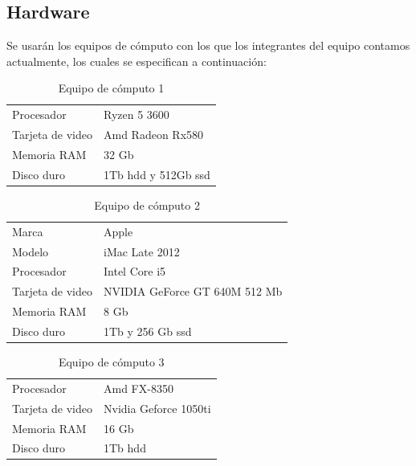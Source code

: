 \documentclass[12pt, a4paper, titlepage]{report}
\begin{document}
			   	\subsection{Hardware}
		Se usarán los equipos de cómputo con los que los integrantes del equipo contamos actualmente, los cuales se especifican a continuación: 
		\begin{table}[H]
			\caption[Equipo de cómputo 1]{Equipo de cómputo 1}
			\begin{tabular}{|p{3.5cm}||p{10cm}|}
				\rowcolor{guindapoli}
				\multicolumn{2}{|c|}{\textbf{\textcolor{white}{Equipo de cómputo utilizado.}}}\\
				\hline
				\rowcolor{azulclaro}Procesador & Ryzen 5 3600\\
				\hline
				\rowcolor{white}Tarjeta de video & Amd Radeon Rx580\\
				\hline
				\rowcolor{azulclaro}Memoria RAM & 32 Gb\\
				\hline
				\rowcolor{white}Disco duro & 1Tb \acrshort{hdd} y 512Gb \acrshort{ssd}\\
				\hline
			\end{tabular}
		\end{table}

		\begin{table}[H]
			\caption[Equipo de cómputo 2]{Equipo de cómputo 2}
			\begin{tabular}{|p{3.5cm}||p{10cm}|}
				\rowcolor{guindapoli}
				\multicolumn{2}{|c|}{\textbf{\textcolor{white}{Equipo de cómputo utilizado.}}}\\
				\hline
				\rowcolor{azulclaro}Marca & Apple\\
				\hline
				\rowcolor{white}Modelo & iMac Late 2012\\
				\hline
				\rowcolor{azulclaro}Procesador & Intel Core i5\\
				\hline
				\rowcolor{white}Tarjeta de video & NVIDIA GeForce GT 640M 512 Mb\\
				\hline
				\rowcolor{azulclaro}Memoria RAM & 8 Gb\\
				\hline
				\rowcolor{white}Disco duro & 1Tb y 256 Gb \acrshort{ssd}\\
				\hline
			\end{tabular}
		\end{table}

		\begin{table}[H]
			\caption[Equipo de cómputo 3]{Equipo de cómputo 3}
			\begin{tabular}{|p{3.5cm}||p{10cm}|}
				\rowcolor{guindapoli}
				\multicolumn{2}{|c|}{\textbf{\textcolor{white}{Equipo de cómputo utilizado.}}}\\
				\hline
				\rowcolor{azulclaro}Procesador & Amd FX-8350\\
				\hline
				\rowcolor{white}Tarjeta de video & Nvidia Geforce 1050ti\\
				\hline
				\rowcolor{azulclaro}Memoria RAM & 16 Gb\\
				\hline
				\rowcolor{white}Disco duro & 1Tb \acrshort{hdd}\\
				\hline
			\end{tabular}
		\end{table}
	   	\newpage
\end{document}
